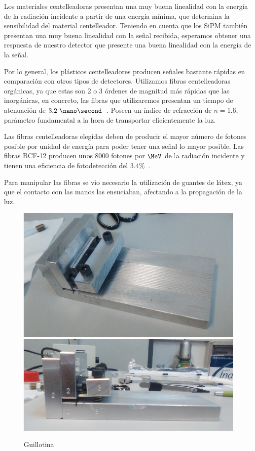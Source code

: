 Los materiales centelleadoras presentan una muy buena linealidad con la energía de la radiación incidente a partir de una energía mínima, que determina la sensibilidad del material centelleador. Teniendo en cuenta que los SiPM también presentan una muy buena linealidad con la señal recibida, esperamos obtener una respuesta de nuestro detector que presente una buena linealidad con la energía de la señal.

Por lo general, los plásticos centelleadores producen señales bastante rápidas en comparación con otros tipos de detectores. Utilizamos fibras centelleadoras orgánicas, ya que estas son 2 o 3 órdenes de magnitud más rápidas que las inorgánicas,  en concreto, las fibras que utilizaremos presentan un tiempo de atenuación de $3.2~\nano\second$~\cite{datasheet}. Poseen un índice de refracción de $n=1.6$, parámetro fundamental a la hora de transportar eficientemente la luz.

Las fibras centelleadoras elegidas deben de producir el mayor número de fotones  posible por unidad de energía para poder tener una señal lo mayor posible. Las fibras BCF-12 producen unos  $8000$ fotones por $\MeV$ de la radiación incidente y tienen una eficiencia de fotodetección  del $3.4\%$~\cite{datasheet}.

Para manipular las fibras se vio necesario la utilización de guantes de látex, ya que el contacto con las manos  las ensuciaban, afectando a  la propagación de la luz.

\begin{figure}[htb]
\centering
{
\includegraphics[scale=0.25]{Guillotina1.png} 
}
{
\includegraphics[scale=0.33]{Guillotina2.png} 
}
\caption{Guillotina\label{Guillotina}}
\end{figure} 


